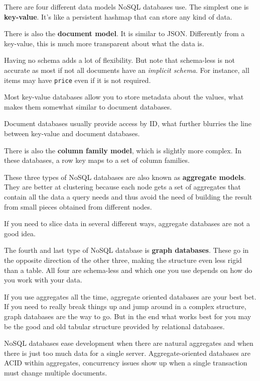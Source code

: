\documentclass[oneside]{book}
\begin{document}
There are four different data models NoSQL databases use.
The simplest one is \textbf{key-value}. It's like a persistent hashmap that can
store any kind of data.

There is also the \textbf{document model}. It is similar to JSON. Differently
from a key-value, this is much more transparent about what the data is.

Having no schema adds a lot of flexibility. But note that schema-less is not
accurate as most if not all documents have an \textit{implicit schema}. For
instance, all items may have \texttt{price} even if it is not required.

Most key-value databases allow you to store metadata about the values, what
makes them somewhat similar to document databases.

Document databases usually provide access by ID, what further blurries the line
between key-value and document databases.

There is also the \textbf{column family model}, which is slightly more complex.
In these databases, a row key maps to a set of column families.

These three types of NoSQL databases are also known as \textbf{aggregate
models}. They are better at clustering because each node gets a set of
aggregates that contain all the data a query needs and thus avoid the need of
building the result from small pieces obtained from different nodes.

If you need to slice data in several different ways, aggregate databases are not
a good idea.

The fourth and last type of NoSQL database is \textbf{graph databases}. These go
in the opposite direction of the other three, making the structure even less
rigid than a table. All four are schema-less and which one you use depends on
how do you work with your data.

If you use aggregates all the time, aggregate oriented databases are your best
bet. If you need to really break things up and jump around in a complex
structure, graph databases are the way to go. But in the end what works best for
you may be the good and old tabular structure provided by relational databases.

NoSQL databases ease development when there are natural aggregates and when
there is just too much data for a single server.
Aggregate-oriented databases are ACID within aggregates, concurrency issues show
up when a single transaction must change multiple documents.
\end{document}
